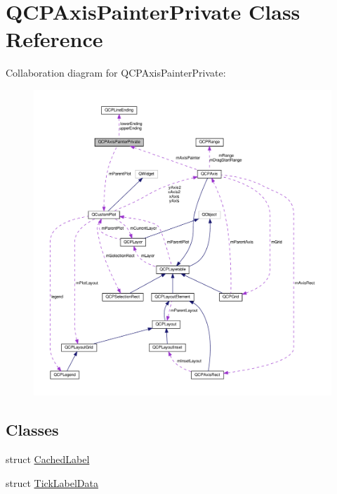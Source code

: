 \hypertarget{classQCPAxisPainterPrivate}{}\section{Q\+C\+P\+Axis\+Painter\+Private Class Reference}
\label{classQCPAxisPainterPrivate}


Collaboration diagram for Q\+C\+P\+Axis\+Painter\+Private\+:\nopagebreak
\begin{figure}[H]
\begin{center}
\leavevmode
\includegraphics[width=350pt]{classQCPAxisPainterPrivate__coll__graph}
\end{center}
\end{figure}
\subsection*{Classes}
\begin{DoxyCompactItemize}
\item 
struct \hyperlink{structQCPAxisPainterPrivate_1_1CachedLabel}{Cached\+Label}
\item 
struct \hyperlink{structQCPAxisPainterPrivate_1_1TickLabelData}{Tick\+Label\+Data}
\end{DoxyCompactItemize}
